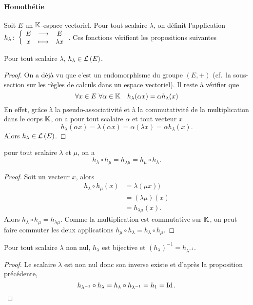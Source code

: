 \paragraph{Homothétie}
Soit \(E\) un \(\mathbb{K}\)-espace vectoriel. Pour tout scalaire \(\lambda\), on
définit l'application \(h_\lambda\colon\left\{\begin{array}{ccc}E & \longrightarrow &E\\x & \longmapsto & \lambda x\end{array}\right.\). Ces
fonctions vérifient les propositions suivantes
\begin{prop}
  Pour tout scalaire \(\lambda\), \(h_\lambda \in \mathcal{L}\left(E\right)\).
\end{prop}
\begin{proof}
  On a déjà vu que c'est un endomorphisme du groupe \((E,+)\) (cf.\ la
  sous-section sur les règles de calculs dans un espace vectoriel). Il reste à
  vérifier que
  \begin{equation}
    \forall x \in E \ \forall \alpha \in \mathbb{K} \quad h_\lambda(\alpha x)=\alpha
    h_\lambda(x)
  \end{equation}
  En effet, grâce à la pseudo-associativité et à la commutativité de la
  multiplication dans le corps \(\mathbb{K}\), on a pour tout scalaire \(\alpha\) et
  tout vecteur \(x\)
  \begin{equation}
    h_\lambda(\alpha x) = \lambda (\alpha x)= \alpha (\lambda x)=\alpha
    h_\lambda(x).
  \end{equation}
  Alors \(h_\lambda \in \mathcal{L}\left(E\right)\).
\end{proof}
\begin{prop}
  pour tout scalaire \(\lambda\) et \(\mu\), on a
  \begin{equation}
    h_\lambda \circ h_\mu = h_{\lambda\mu}=h_\mu \circ h_\lambda.
  \end{equation}
\end{prop}
\begin{proof}
  Soit un vecteur \(x\), alors
  \begin{align}
    h_\lambda \circ h_\mu(x)&= \lambda(\mu x)) \\
    &=(\lambda\mu)(x)\\
    &= h_{\lambda\mu}(x).
  \end{align}
  Alors \(h_\lambda \circ h_\mu = h_{\lambda\mu}\). Comme la multiplication est
  commutative sur \(\mathbb{K}\), on peut faire commuter les deux applications \(h_\mu
  \circ h_\lambda=h_\lambda \circ h_\mu \).
\end{proof}
\begin{prop}
  Pour tout scalaire \(\lambda\) non nul, \(h_\lambda\) est bijective et
  \((h_\lambda)^{-1}=h_{\lambda^{-1}}\).
\end{prop}
\begin{proof}
  Le scalaire \(\lambda\) est non nul donc son inverse existe et d'après la
  proposition précédente,
  \begin{equation}
    h_{\lambda^{-1}} \circ h_\lambda = h_\lambda \circ h_{\lambda^{-1}} =
    h_1=\operatorname{Id}.
  \end{equation}
\end{proof}

